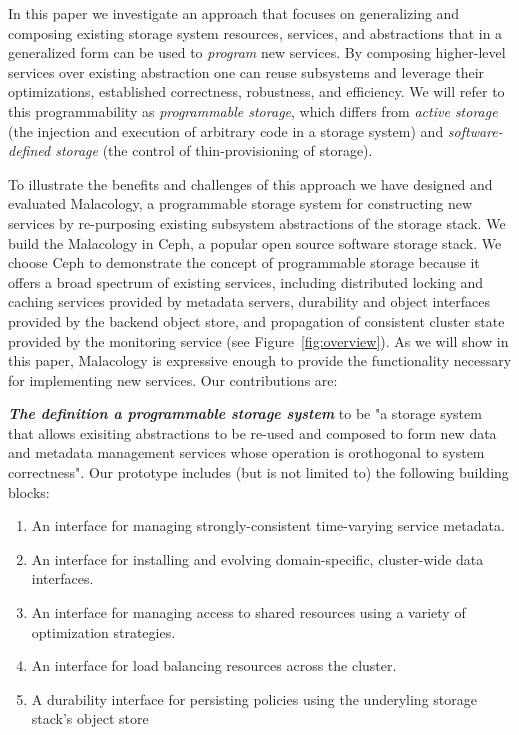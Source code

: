 \documentclass[preprint]{sigplanconf-eurosys}
\begin{document}
In this paper we investigate an approach that focuses on generalizing and
composing existing
storage system resources, services, and abstractions that in a generalized form
can be used to \emph{program} new services. By composing higher-level services
over existing abstraction one can reuse
subsystems and leverage their optimizations, established correctness,
robustness, and efficiency. We will refer to this programmability as
\emph{programmable storage}, which differs from \emph{active storage} (the
injection and execution of arbitrary code in a storage system) and
\emph{software-defined storage} (the control of thin-provisioning of storage).

To illustrate the benefits and challenges of this approach we have designed and
evaluated Malacology, a programmable storage system for constructing new
services by re-purposing existing subsystem abstractions of the storage stack.
We build the Malacology in Ceph, a popular open source software storage stack.
We choose Ceph to demonstrate the concept of programmable storage because it
offers a broad spectrum of existing services, including distributed locking and
caching services provided by metadata servers, durability and object interfaces
provided by the backend object store, and propagation of consistent
cluster state provided by the monitoring service (see
Figure~\ref{fig:overview}). As we will show in this paper, Malacology is
expressive enough to provide the functionality necessary for implementing new
services. Our contributions are:

{\it \textbf{The definition a programmable storage system}} to be "a storage
system that allows exisiting abstractions to be re-used and composed to form
new data and metadata management services whose operation is orothogonal to
system correctness".  Our prototype includes (but is not limited to) the
following building blocks:

\begin{enumerate}

\item An interface for managing strongly-consistent time-varying service
metadata.  

\item An interface for installing and evolving domain-specific, cluster-wide data
interfaces.

\item An interface for managing access to shared resources using a variety of
optimization strategies.

\item An interface for load balancing resources across the cluster.

\item A durability interface for persisting policies using the underyling storage
stack's object store

\end{enumerate}
\end{document}
